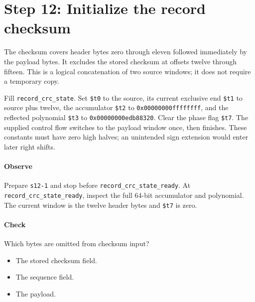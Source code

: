 \section{Step 12: Initialize the record checksum}
The checksum covers header bytes zero through eleven followed immediately by
the payload bytes. It excludes the stored checksum at offsets twelve through
fifteen. This is a logical concatenation of two source windows; it does not
require a temporary copy.

Fill \texttt{record\_crc\_state}. Set \texttt{\$t0} to the source, its current
exclusive end \texttt{\$t1} to source plus twelve, the accumulator
\texttt{\$t2} to \texttt{0x00000000ffffffff}, and the reflected polynomial
\texttt{\$t3} to \texttt{0x00000000edb88320}. Clear the phase flag
\texttt{\$t7}. The supplied control flow switches to the payload window once,
then finishes. These constants must have zero high halves; an unintended
sign extension would enter later right shifts.

\paragraph{Observe} Prepare \texttt{s12-1} and stop before
\texttt{record\_crc\_state\_ready}. At \texttt{record\_crc\_state\_ready}, inspect the full 64-bit
accumulator and polynomial. The current window is the twelve header bytes and
\texttt{\$t7} is zero.

\paragraph{Check} Which bytes are omitted from checksum input?
\begin{itemize}
  \item[A.] The stored checksum field.
  \item[B.] The sequence field.
  \item[C.] The payload.
\end{itemize}
